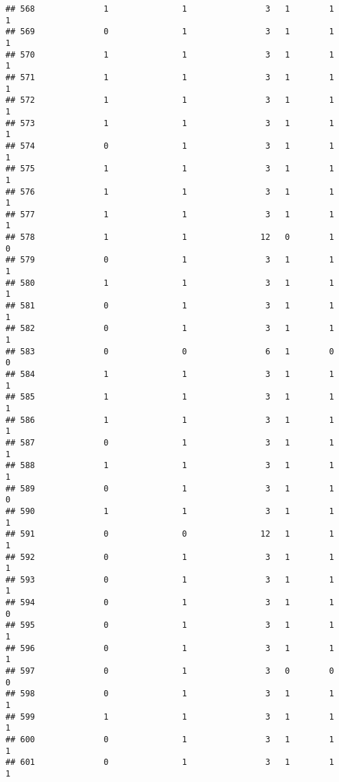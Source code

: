 \documentclass[]{article}
\begin{document}
\begin{verbatim}
## 568              1               1                3   1        1        1
## 569              0               1                3   1        1        1
## 570              1               1                3   1        1        1
## 571              1               1                3   1        1        1
## 572              1               1                3   1        1        1
## 573              1               1                3   1        1        1
## 574              0               1                3   1        1        1
## 575              1               1                3   1        1        1
## 576              1               1                3   1        1        1
## 577              1               1                3   1        1        1
## 578              1               1               12   0        1        0
## 579              0               1                3   1        1        1
## 580              1               1                3   1        1        1
## 581              0               1                3   1        1        1
## 582              0               1                3   1        1        1
## 583              0               0                6   1        0        0
## 584              1               1                3   1        1        1
## 585              1               1                3   1        1        1
## 586              1               1                3   1        1        1
## 587              0               1                3   1        1        1
## 588              1               1                3   1        1        1
## 589              0               1                3   1        1        0
## 590              1               1                3   1        1        1
## 591              0               0               12   1        1        1
## 592              0               1                3   1        1        1
## 593              0               1                3   1        1        1
## 594              0               1                3   1        1        0
## 595              0               1                3   1        1        1
## 596              0               1                3   1        1        1
## 597              0               1                3   0        0        0
## 598              0               1                3   1        1        1
## 599              1               1                3   1        1        1
## 600              0               1                3   1        1        1
## 601              0               1                3   1        1        1

\end{verbatim}
\end{document}
